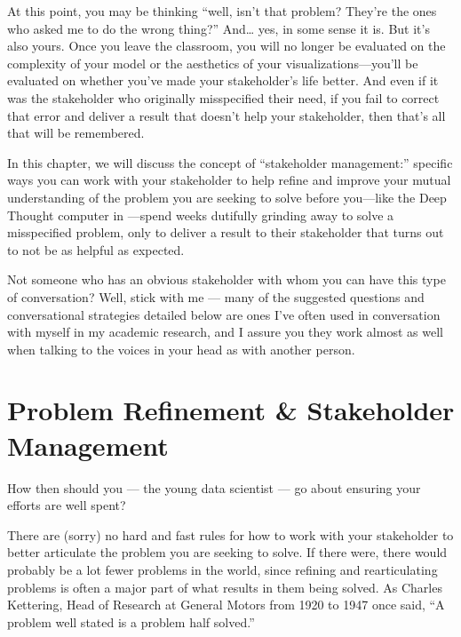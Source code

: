 \documentclass[letterpaper,10pt,english]{jupyterBook}
\begin{document}
\sphinxAtStartPar
At this point, you may be thinking “well, isn’t that  problem? They’re the ones who asked me to do the wrong thing?” And… yes, in some sense it is. But it’s also yours. Once you leave the classroom, you will no longer be evaluated on the complexity of your model or the aesthetics of your visualizations—you’ll be evaluated on whether you’ve made your stakeholder’s life better. And even if it was the stakeholder who originally misspecified their need, if you fail to correct that error and deliver a result that doesn’t help your stakeholder, then that’s all that will be remembered.

\sphinxAtStartPar
In this chapter, we will discuss the concept of “stakeholder management:” specific ways you can work with your stakeholder to help refine and improve your mutual understanding of the problem you are seeking to solve before you—like the Deep Thought computer in —spend weeks dutifully grinding away to solve a misspecified problem, only to deliver a result to their stakeholder that turns out to not be as helpful as expected.

\sphinxAtStartPar
Not someone who has an obvious stakeholder with whom you can have this type of conversation? Well, stick with me — many of the suggested questions and conversational strategies detailed below are ones I’ve often used in conversation with myself in my academic research, and I assure you they work almost as well when talking to the voices in your head as with another person.


\section{Problem Refinement \& Stakeholder Management}
\label{\detokenize{10_introduction/30_solving_the_right_problem:problem-refinement-stakeholder-management}}
\sphinxAtStartPar
How then should you — the young data scientist — go about ensuring your efforts are well spent?

\sphinxAtStartPar
There are (sorry) no hard and fast rules for how to work with your stakeholder to better articulate the problem you are seeking to solve. If there were, there would probably be a lot fewer problems in the world, since refining and re\sphinxhyphen{}articulating problems is often a major part of what results in them being solved. As Charles Kettering, Head of Research at General Motors from 1920 to 1947 once said, “A problem well stated is a problem half solved.”
\end{document}
